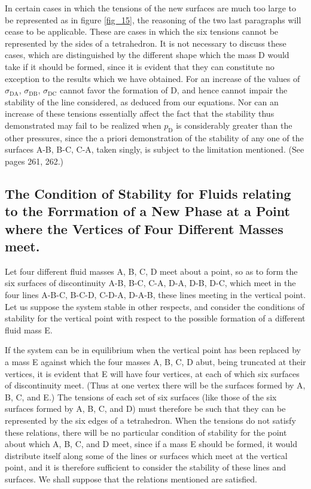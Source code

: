 \documentclass[12pt]{article}
\begin{document}
In certain cases in which the tensions of the new surfaces are much too large to be represented as in figure \ref{fig_15}, the reasoning of the two last paragraphs will cease to be applicable. These are cases in which the six tensions cannot be represented by the sides of a tetrahedron. It is not necessary to discuss these cases, which are distinguished by the different shape which the mass D would take if it should be formed, since it is evident that they can constitute no exception to the results which we have obtained. For an increase of the values of $\sigma_{\text{DA}}$, $\sigma_{\text{DB}}$, $\sigma_{\text{DC}}$ cannot favor the formation of D, and hence cannot impair the stability of the line considered, as deduced from our equations. Nor can an increase of these tensions essentially affect the fact that the stability thus demonstrated may fail to be realized when $p_\text{D}$ is considerably greater than the other pressures, since the a priori demonstration of the stability of any one of the surfaces A-B, B-C, C-A, taken singly, is subject to the limitation mentioned. (See pages 261, 262.)

\subsection{The Condition of Stability for Fluids relating to the Forrmation of a New Phase at a Point where the Vertices of Four Different Masses meet.}
Let four different fluid masses A, B, C, D meet about a point, so as to form the six surfaces of discontinuity A-B, B-C, C-A, D-A, D-B, D-C, which meet in the four lines A-B-C, B-C-D, C-D-A, D-A-B, these lines meeting in the vertical point. Let us suppose the system stable in other respects, and consider the conditions of stability for the vertical point with respect to the possible formation of a different fluid mass E. 

If the system can be in equilibrium when the vertical point has been replaced by a mass E against which the four masses A, B, C, D abut, being truncated at their vertices, it is evident that E will have four vertices, at each of which six surfaces of discontinuity meet. (Thus at one vertex there will be the surfaces formed by A, B, C, and E.) The tensions of each set of six surfaces (like those of the six surfaces formed by A, B, C, and D) must therefore be such that they can be represented by the six edges of a tetrahedron. When the tensions do not satisfy these relations, there will be no particular condition of stability for the point about which A, B, C, and D meet, since if a mass E should be formed, it would distribute itself along some of the lines or surfaces which meet at the vertical point, and it is therefore sufficient to consider the stability of these lines and surfaces. We shall suppose that the relations mentioned are satisfied.
\end{document}
